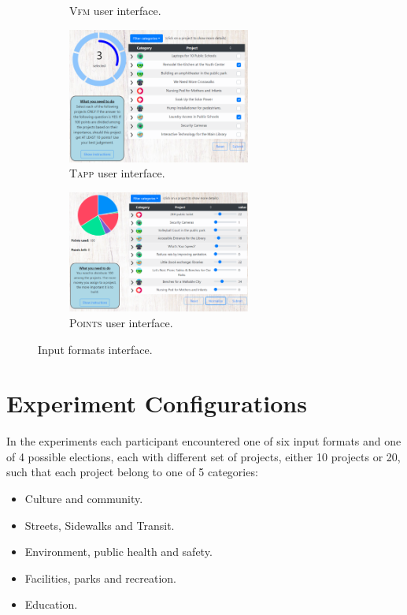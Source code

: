 \documentclass{comsoc2023}
\newcommand{\points}{\textsc{Points}}
\newcommand{\vfm}{\textsc{Vfm}}
\newcommand{\tapp}{\textsc{Tapp}}
\begin{document}
\begin{figure}[ht!]
\begin{subfigure}[b]{0.45\textwidth}
\caption{\vfm{} user interface.
}\label{fig:vfm_inter}
     \end{subfigure}
     \begin{subfigure}[b]{0.45\textwidth}
         \centering
\includegraphics[width=6cm]{experiment/threshold approval.PNG}
\caption{\tapp{} user interface.
}\label{fig:tapp_inter}
     \end{subfigure}
     \hfill
     \begin{subfigure}[b]{0.45\textwidth}
         \centering
\includegraphics[width=6cm]{experiment/utilities.PNG}
\caption{\points{} user interface.
}\label{fig:util_inter}
     \end{subfigure}
     

        \caption{Input formats interface.}
        \label{fig:all_interfaces}
\end{figure}


\section{Experiment Configurations}\label{app:elections}

In the experiments each participant encountered one of six input formats and one of 4 possible elections, each with different set of projects, either 10 projects or 20, such that each project belong to one of 5 categories:

\begin{itemize}
    \item Culture and community.
    \item Streets, Sidewalks and Transit.
    \item Environment, public health and safety.
    \item Facilities, parks and recreation.
    \item Education.
\end{itemize}
\end{document}
